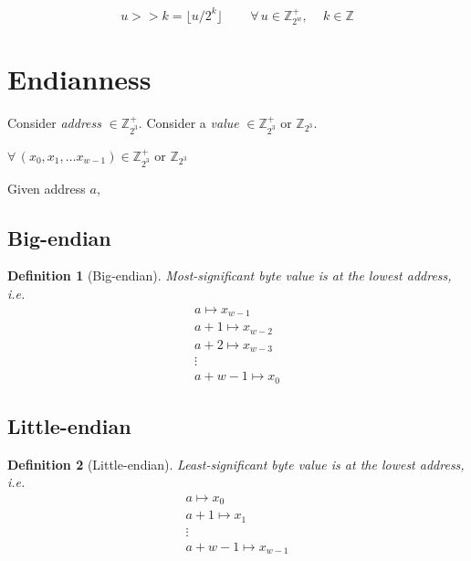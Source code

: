 \documentclass[10pt]{amsart}
\newtheorem{definition}{Definition}
\begin{document}
\begin{multicols*}{2}
\begin{equation}
u >> k = \lfloor u / 2^k \rfloor \qquad \, \forall \, u \in \mathbb{Z}^+_{2^w}, \quad \, k \in \mathbb{Z}  
\end{equation}

\section{Endianness} 

Consider \emph{address} $\in \mathbb{Z}^+_{2^3}$.  Consider a \emph{value} $\in \mathbb{Z}^+_{2^3}$ or $\mathbb{Z}_{2^3}$. 

$\forall \, (x_0, x_1, \dots x_{w-1}) \in \mathbb{Z}^+_{2^3} \text{ or } \mathbb{Z}_{2^3}$

Given address $a$, 

\subsection{Big-endian}

\begin{definition}[Big-endian]
	Most-significant byte value is at the lowest address, i.e. 
	\begin{equation}
	\begin{gathered}
	a \mapsto x_{w-1} \\
	a+1 \mapsto x_{w-2} \\ 
	a+2 \mapsto x_{w-3} \\ 
	\vdots \\
	a+w - 1 \mapsto x_0 
	\end{gathered}
	\end{equation}
	\end{definition} 

\subsection{Little-endian}

\begin{definition}[Little-endian]
Least-significant byte value is at the lowest address, i.e.
\begin{equation}
\begin{gathered}
a \mapsto x_0 \\
a + 1 \mapsto x_1 \\
\vdots \\
a+w - 1 \mapsto x_{w-1}
\end{gathered}
\end{equation}


\end{definition}
\end{multicols*}
\end{document}
